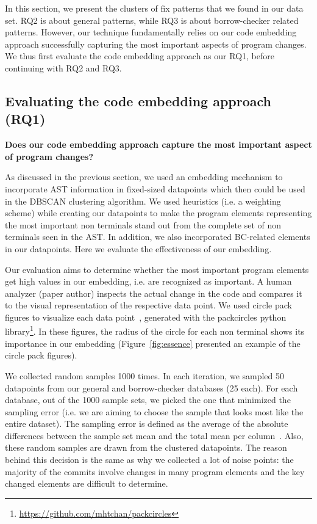 In this section, we present the clusters of fix patterns that we found in our data set. RQ2 is about general patterns, while RQ3 is about borrow-checker related patterns. However, our technique fundamentally relies on our code embedding approach successfully capturing the most important aspects of program changes. We thus first evaluate the code embedding approach as our RQ1, before continuing with RQ2 and RQ3.

\subsection{Evaluating the code embedding approach (RQ1)}

\textbf{Does our code embedding approach capture the most important aspect of program changes?} 


As discussed in the previous section, we used an embedding mechanism to incorporate AST information in fixed-sized datapoints which then could be used in the DBSCAN clustering algorithm. We used heuristics (i.e. a weighting scheme) while creating our datapoints to make the program elements representing the most important non terminals stand out from the complete set of non terminals seen in the AST. In addition, we also incorporated BC-related elements in our datapoints. Here we evaluate the effectiveness of our embedding.

Our evaluation aims to determine whether the most important program elements get high values in our embedding, i.e. are recognized as important. A human analyzer (paper author) inspects the actual change in the code and compares it to the visual representation of the respective data point. We used circle pack figures to visualize each data point~\citep{collins2003circle}, generated with the packcircles python library\footnote{\url{https://github.com/mhtchan/packcircles}}. In these figures, the radius of the circle for each non terminal shows its importance in our embedding (Figure~\ref{fig:essence} presented an example of the circle pack figures).

We collected random samples 1000 times. In each iteration, we sampled 50 datapoints from our general and borrow-checker databases (25 each). For each database, out of the 1000 sample sets, we picked the one that minimized the sampling error (i.e. we are aiming to choose the sample that looks most like the entire dataset). The sampling error is defined as the average of the absolute differences between the sample set mean and the total mean per column~\citep{degroot2012probability}. Also, these random samples are drawn from the clustered datapoints. The reason behind this decision is the same as why we collected a lot of noise points: the majority of the commits involve changes in many program elements and the key changed elements are difficult to determine.


